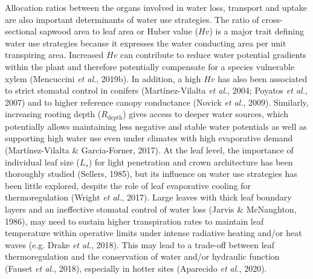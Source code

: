 \documentclass[11pt,twoside]{reedthesis}
\begin{document}
Allocation ratios between the organs involved in water loss, transport
and uptake are also important determinants of water use strategies. The
ratio of cross-sectional sapwood area to leaf area or Huber value
(\(Hv\)) is a major trait defining water use strategies because it
expresses the water conducting area per unit transpiring area. Increased
\(Hv\) can contribute to reduce water potential gradients within the
plant and therefore potentially compensate for a species vulnerable
xylem (Mencuccini \emph{et al.}, 2019b). In addition, a high \(Hv\) has
also been associated to strict stomatal control in conifers
(Martínez-Vilalta \emph{et al.}, 2004; Poyatos \emph{et al.}, 2007) and
to higher reference canopy conductance (Novick \emph{et al.}, 2009).
Similarly, increasing rooting depth (\(R_{\text{depth}}\)) gives access
to deeper water sources, which potentially allows maintaining less
negative and stable water potentials as well as supporting high water
use even under climates with high evaporative demand (Martínez-Vilalta
\& Garcia-Forner, 2017). At the leaf level, the importance of individual
leaf size (\(L_s\)) for light penetration and crown architecture has
been thoroughly studied (Sellers, 1985), but its influence on water use
strategies has been little explored, despite the role of leaf
evaporative cooling for thermoregulation (Wright \emph{et al.}, 2017).
Large leaves with thick leaf boundary layers and an ineffective stomatal
control of water loss (Jarvis \& McNaughton, 1986), may need to sustain
higher transpiration rates to maintain leaf temperature within operative
limits under intense radiative heating and/or heat waves (e.g. Drake
\emph{et al.}, 2018). This may lead to a trade-off between leaf
thermoregulation and the conservation of water and/or hydraulic function
(Fauset \emph{et al.}, 2018), especially in hotter sites (Aparecido
\emph{et al.}, 2020).\par
\end{document}
